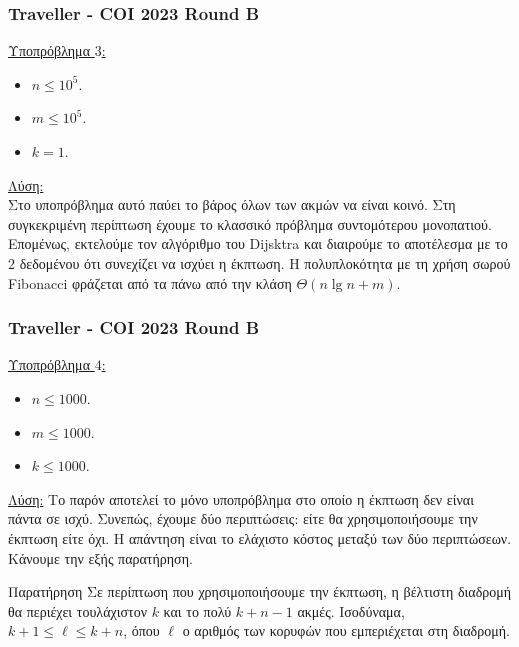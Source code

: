 \documentclass[t]{beamer}
\begin{document}
\begin{frame}
	\frametitle{Traveller - COI 2023 Round B}
	\underline{Υποπρόβλημα $3$:}
	\pause
	\vspace{0.25cm} 
	\begin{itemize}
		\item $n \leq 10^5$.
		\pause
		\item $m \leq 10^5$.
		\pause
		\item $k = 1$.
	\end{itemize}
	\pause
	\vspace{0.25cm} 
	\underline{Λύση:}
	\pause
	\\
	\vspace{0.25cm} 
	Στο υποπρόβλημα αυτό παύει το βάρος όλων των ακμών να είναι κοινό. Στη συγκεκριμένη περίπτωση έχουμε το κλασσικό πρόβλημα συντομότερου μονοπατιού.
	\pause
	\\
	\vspace{0.25cm} 
	Επομένως, εκτελούμε τον αλγόριθμο του Dijsktra και διαιρούμε το αποτέλεσμα με το $2$ δεδομένου ότι συνεχίζει να ισχύει η έκπτωση. Η πολυπλοκότητα με τη χρήση σωρού Fibonacci φράζεται από τα πάνω από την 
	κλάση $\Theta(n \lg n + m)$.
\end{frame}

\begin{frame}
	\frametitle{Traveller - COI 2023 Round B}
	\underline{Υποπρόβλημα $4$:}
	\pause
	\vspace{0.25cm} 
	\begin{itemize}
		\item $n \leq 1000$.
		\pause
		\item $m \leq 1000$.
		\pause
		\item $k \leq 1000$.
	\end{itemize}
	\pause
	\vspace{0.25cm} 
	\underline{Λύση:}
	Το παρόν αποτελεί το μόνο υποπρόβλημα στο οποίο η έκπτωση δεν είναι πάντα σε ισχύ. Συνεπώς, έχουμε 
	δύο περιπτώσεις: είτε θα χρησιμοποιήσουμε την έκπτωση είτε όχι. Η απάντηση είναι το ελάχιστο κόστος μεταξύ των δύο 
	περιπτώσεων. Κάνουμε την εξής παρατήρηση.
	\pause
	\begin{block}{Παρατήρηση}
		Σε περίπτωση που χρησιμοποιήσουμε την έκπτωση, η βέλτιστη διαδρομή θα περιέχει τουλάχιστον $k$ και το πολύ 
		$k + n - 1$ ακμές. Ισοδύναμα, $k + 1 \leq \ell \leq k + n$,
		όπου $\ell$ ο αριθμός των κορυφών που εμπεριέχεται στη διαδρομή.
	\end{block}
\end{frame}
\end{document}
